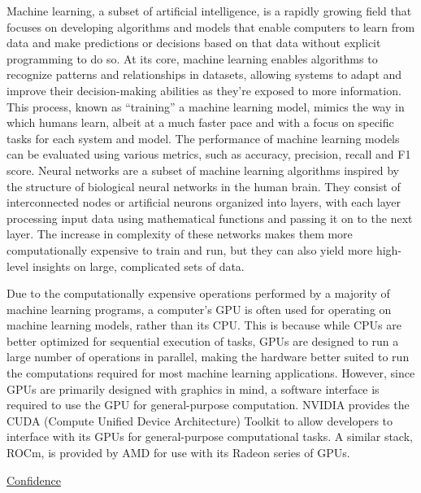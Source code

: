 \documentclass[titlepage,draft]{article}
\begin{document}
Machine learning, a subset of artificial intelligence, is a rapidly growing field that focuses on developing algorithms and
models that enable computers to learn from data and make predictions or decisions based on that data without explicit programming
to do so.
At its core, machine learning enables algorithms to recognize patterns and relationships in datasets, allowing systems to adapt
and improve their decision-making abilities as they're exposed to more information.
This process, known as ``training'' a machine learning model, mimics the way in which humans learn, albeit at a much faster pace
and with a focus on specific tasks for each system and model.
The performance of machine learning models can be evaluated using various metrics, such as accuracy, precision, recall and F1
score.
Neural networks are a subset of machine learning algorithms inspired by the structure of biological neural networks in the human
brain.
They consist of interconnected nodes or artificial neurons organized into layers, with each layer processing input data using
mathematical functions and passing it on to the next layer.
The increase in complexity of these networks makes them more computationally expensive to train and run, but they can also yield
more high-level insights on large, complicated sets of data.

Due to the computationally expensive operations performed by a majority of machine learning programs, a computer's GPU is often
used for operating on machine learning models, rather than its CPU.
This is because while CPUs are better optimized for sequential execution of tasks, GPUs are designed to run a large number of
operations in parallel, making the hardware better suited to run the computations required for most machine learning applications.
However, since GPUs are primarily designed with graphics in mind, a software interface is required to use the GPU for
general-purpose computation.
NVIDIA provides the CUDA (Compute Unified Device Architecture) Toolkit \cite{CUDA} to allow developers to interface with its
GPUs for general-purpose computational tasks.
A similar stack, ROCm, is provided by AMD for use with its Radeon series of GPUs. \cite{ROCm}

\underline{Confidence}
\end{document}
